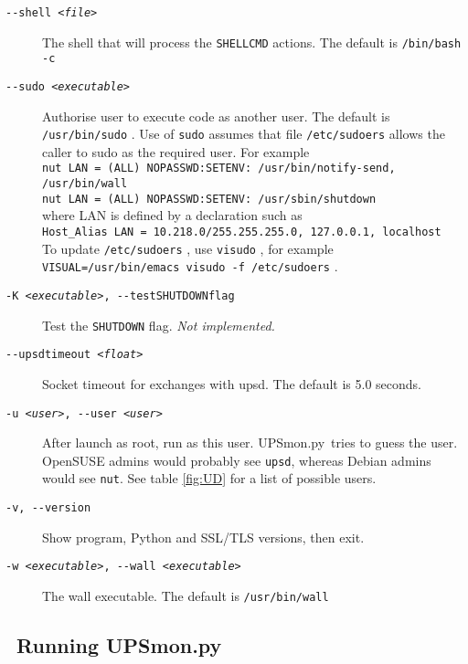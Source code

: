 \documentclass[12pt]{article}
\newlength{\headersep}\setlength{\headersep}{3mm}
\newcommand{\Hsep}{\hspace{\headersep}}
\newcommand{\newcolumn}{\vfill\eject}
\newcommand{\upsd}{\mbox{\textcolor{UPSDCOLOUR}{upsd}}}
\newcommand{\UPSmon}{\mbox{\textcolor{UPSMONCOLOUR}{UPSmon.py}}}
\begin{document}
\begin{description}
\item[\texttt{-\/-shell \textit{<file>}}] The shell that will process the
  \texttt{SHELLCMD} actions. The default is \texttt{/bin/bash -c}

\item[\texttt{-\/-sudo \textit{<executable>}}] Authorise user to
  execute code as another user.  The default is
  \texttt{/usr/bin/{\allowbreak}sudo} . Use of \texttt{sudo} assumes
  that file \texttt{/etc/sudoers} allows the caller to sudo as the
  required user.  For example \\ \texttt{nut LAN = (ALL)
    NOPASSWD:SETENV: /usr/bin/notify-send, /usr/bin/wall}
  \\ \texttt{nut LAN = (ALL) NOPASSWD:SETENV:
    /usr/sbin/{\allowbreak}shutdown} \\ where LAN is defined by a
  declaration such as \\ \texttt{Host\_Alias LAN =
    10.218.0/255.255.255.0, 127.0.0.1, localhost} \\ To update
  \texttt{/etc/sudoers} , use \texttt{visudo} , for example
  \texttt{VISUAL=/usr/{\allowbreak}bin/{\allowbreak}emacs visudo -f
    /etc/{\allowbreak}sudoers} .

\item[\texttt{-K \textit{<executable>}, -\/-testSHUTDOWNflag }] Test
  the \texttt{SHUTDOWN} flag. \textit{Not implemented.}

\item[\texttt{-\/-upsdtimeout \textit{<float>}}] Socket timeout for exchanges
  with \upsd. The default is 5.0 seconds.

\item[\texttt{-u \textit{<user>}, -\/-user \textit{<user>}}] After launch as
  root, run as this user.  \UPSmon\ tries to guess the user. OpenSUSE admins
  would probably see \texttt{upsd}, whereas Debian admins would see
  \texttt{nut}. See table \ref{fig:UD} for a list of possible users.

\item[\texttt{-v, -\/-version}] Show program, Python and SSL/TLS versions,
  then exit.

\item[\texttt{-w \textit{<executable>}, -\/-wall \textit{<executable>}}] The
  wall executable. The default is \texttt{/usr/bin/wall}

\end{description}

\newcolumn
\subsection{\Hsep\ Running \UPSmon}\label{section:UMrun}
\end{document}
